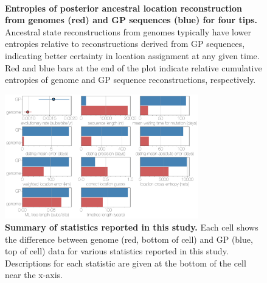 \documentclass[11pt,oneside,letterpaper]{article}
\begin{document}
\begin{figure}[h]
 \centering
  \\
  \caption{\textbf{Entropies of posterior ancestral location reconstruction from genomes (red) and GP sequences (blue) for four tips.}
  Ancestral state reconstructions from genomes typically have lower entropies relative to reconstructions derived from GP sequences, indicating better certainty in location assignment at any given time.
  Red and blue bars at the end of the plot indicate relative cumulative entropies of genome and GP sequence reconstructions, respectively.
  }
	\label{trace_entropy}
\end{figure}

\begin{figure}[h]
 \centering
	\includegraphics[width=0.75\textwidth]{supp_figures/sfigX_summary.png}
	\caption{\textbf{Summary of statistics reported in this study.}
  Each cell shows the difference between genome (red, bottom of cell) and GP (blue, top of cell) data for various statistics reported in this study.
  Descriptions for each statistic are given at the bottom of the cell near the x-axis.
	}
	\label{summary}
\end{figure}
\end{document}
